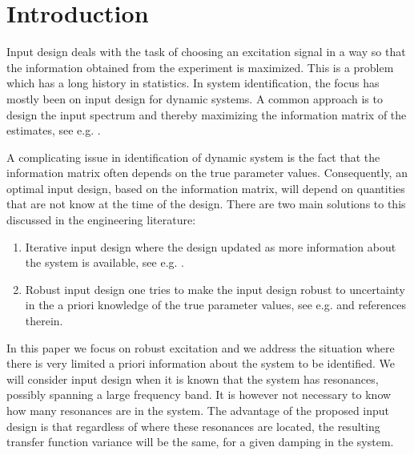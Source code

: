 \section{Introduction}\label{sec:excitation:sysid2012:intro}
Input design deals with the task of choosing an excitation signal in a way so that the information obtained from the experiment is maximized. This is a problem which has a long history in statistics. In system identification, the focus has mostly been on input design for dynamic systems. A common approach is to design the input spectrum and thereby maximizing the information matrix of the estimates, see e.g. \cite{Fedorov1972,Goodwin1977}.

A complicating issue in identification of dynamic system is the fact that the information matrix often depends on the true parameter values. Consequently, an optimal input design, based on the information matrix, will depend on quantities that are not know at the time of the design. There are two main solutions to this discussed in the engineering literature:
\begin{enumerate}
\item Iterative input design where the design updated as more information about the system is available, see e.g. \cite{Hjalmarsson2005,Gevers2005}.
\item Robust input design one tries to make the input design robust to uncertainty in the a priori knowledge of the true parameter values, see e.g. \cite{Rojas2007} and references therein. 
\end{enumerate}

In this paper we focus on robust excitation and we address the situation where there is very limited a priori information about the system to be identified. We will consider input design when it is known that the system has resonances, possibly spanning a large frequency band. It is however not necessary to know how many resonances are in the system. The advantage of the proposed input design is that regardless of where these resonances are located, the resulting transfer function variance will be the same, for a given damping in the system.


